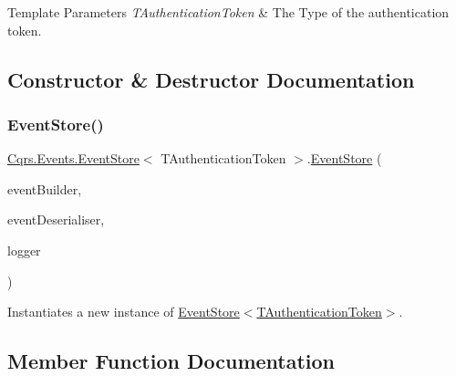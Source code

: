\begin{DoxyTemplParams}{Template Parameters}
{\em T\+Authentication\+Token} & The Type of the authentication token.\\
\hline
\end{DoxyTemplParams}


\subsection{Constructor \& Destructor Documentation}
\mbox{\label{classCqrs_1_1Events_1_1EventStore_a6346cb2aea4c5b4e740dc6cfb15abab8_a6346cb2aea4c5b4e740dc6cfb15abab8}} 
\subsubsection{\texorpdfstring{Event\+Store()}{EventStore()}}
{\footnotesize\ttfamily \hyperlink{classCqrs_1_1Events_1_1EventStore}{Cqrs.\+Events.\+Event\+Store}$<$ T\+Authentication\+Token $>$.\hyperlink{classCqrs_1_1Events_1_1EventStore}{Event\+Store} (\begin{DoxyParamCaption}\item[{\hyperlink{interfaceCqrs_1_1Events_1_1IEventBuilder}{I\+Event\+Builder}$<$ T\+Authentication\+Token $>$}]{event\+Builder,  }\item[{\hyperlink{interfaceCqrs_1_1Events_1_1IEventDeserialiser}{I\+Event\+Deserialiser}$<$ T\+Authentication\+Token $>$}]{event\+Deserialiser,  }\item[{I\+Logger}]{logger }\end{DoxyParamCaption})\hspace{0.3cm}{\ttfamily [protected]}}



Instantiates a new instance of \hyperlink{classCqrs_1_1Events_1_1EventStore_a6346cb2aea4c5b4e740dc6cfb15abab8_a6346cb2aea4c5b4e740dc6cfb15abab8}{Event\+Store$<$\+T\+Authentication\+Token$>$}. 



\subsection{Member Function Documentation}
\mbox{\label{classCqrs_1_1Events_1_1EventStore_a03df06d4ce9c6d16201c079f2de0a7f3_a03df06d4ce9c6d16201c079f2de0a7f3}} 
